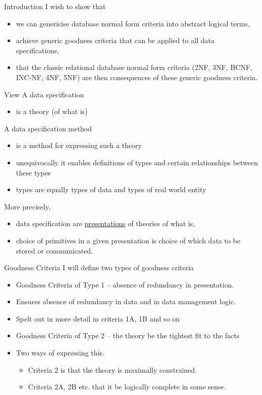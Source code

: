 
\begin{frame}{Introduction}
I wish to show that
\begin{itemize}
\item we can genericise database normal form criteria into abstract logical terms,
\item achieve generic goodness criteria that can be applied to all data specifications,
 \item that the classic relational database normal form criteria (2NF, 3NF, BCNF, INC-NF, 4NF, 5NF)  are then consequences of these generic goodness criteria.
\end{itemize}
\end{frame}

\begin{frame}{View}
A data specification  
\begin{itemize}
\item is a  theory (of what is)
\end{itemize}
\medskip
A data specification method 
\begin{itemize}
\item is a method for expressing such a  theory
\item unequivocally it enables definitions of types and certain relationships between these types
\item types are equally types of data and types of real world entity
\end{itemize}
More precisely, 
\begin{itemize}
\item data specification are \underline{presentations} of theories of what is,
\item choice of primitives in a given presentation is choice of which data to be stored or communicated.
\end{itemize}
\end{frame}



\begin{frame}{Goodness Criteria}
I will define two types of goodness criteria
\begin{itemize}
    \item Goodness Criteria of Type 1 -- absence of redundancy in presentation.
    \item Ensures absence of redundancy in data and in data management logic.
    \item Spelt out in more detail in criteria 1A, 1B and so on
    \item  Goodness Criteria of Type 2 -- the theory be the tightest fit to the facts 
    \item Two ways of expressing this. 
    \begin{itemize}
        \item Criteria 2 is that the theory is maximally constrained.
        \item Criteria 2A, 2B etc.  that it be logically complete in some sense.
    \end{itemize}
\end{itemize}
\end{frame}

